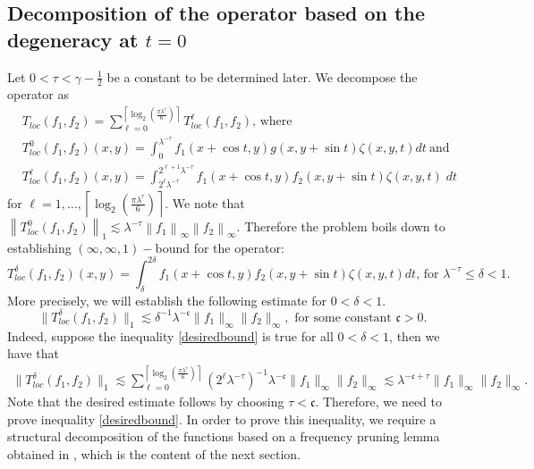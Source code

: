 \documentclass[a4paper,reqno]{amsart}
\theoremstyle{definition}
\theoremstyle{remark}
\numberwithin{equation}{section}
\begin{document}
	\subsection{Decomposition of the operator based on the degeneracy at $t=0$}\label{sec:degeneracy} Let $0<\tau<\gamma-\frac{1}{2}$ be a constant to be determined later. We decompose the operator as
	\[
	\begin{aligned}
		& T_{loc}(f_1,f_2)=\sum_{\ell=0}^{\left\lceil\log_2\left(\frac{\pi\lambda^\tau}{6}\right)\right\rceil} T_{loc}^\ell(f_1,f_2) \text {, where } \\
		& T_{loc}^0(f_1,f_2)(x, y)=\int_0^{\lambda^{-\tau}} f_1(x+\cos t, y) g(x, y+\sin t) \zeta(x,y,t) d t~ \text {and } \\
		& T_{loc}^\ell(f_1,f_2)(x, y)=\int_{2^{\ell} \lambda^{-\tau}}^{2^{\ell+1} \lambda^{-\tau}} f_1(x+\cos t, y) f_2(x, y+\sin t) \zeta(x,y,t)\; d t
	\end{aligned}
	\]
	for $\ell=1,\dots, \left\lceil\log_2\left(\frac{\pi\lambda^\tau}{6}\right)\right\rceil.$	We note that $\left\|T_{loc}^0\left(f_1, f_2\right)\right\|_1 \lesssim \lambda^{-\tau}\left\|f_1\right\|_\infty\left\|f_2\right\|_{\infty}$. Therefore the problem boils down to establishing $(\infty,\infty,1)-$bound for the operator:
	\[
	T_{loc}^\delta\left(f_1, f_2\right)(x, y)=\int_\delta^{2 \delta} f_1(x+\cos t, y) f_2(x, y+\sin t) \zeta(x,y,t) d t \text {, for } \lambda^{-\tau}\leq\delta<1.
	\]
	More precisely, we will establish the following estimate for $0<\delta<1$.
	\begin{equation}\label{desiredbound}
		\|T_{loc}^\delta(f_1,f_2)\|_1\lesssim\delta^{-1}\lambda^{-\mathfrak{c}}\|f_1\|_\infty\|f_2\|_\infty, \text{ for some constant }\mathfrak{c}>0.
	\end{equation}
	Indeed, suppose the inequality \eqref{desiredbound} is true for all $0<\delta<1$, then we have that
	\begin{align*}
		\|T_{loc}^\delta(f_1,f_2)\|_1\lesssim\sum\limits_{\ell=0}^{\left\lceil\log_2\left(\frac{\pi\lambda^\tau}{6}\right)\right\rceil}(2^\ell\lambda^{-\tau})^{-1}\lambda^{-\mathfrak{c}}\|f_1\|_\infty\|f_2\|_\infty\lesssim\lambda^{-\mathfrak{c}+\tau}\|f_1\|_\infty\|f_2\|_\infty.
	\end{align*} 
	Note that the desired estimate follows by choosing $\tau<\mathfrak{c}$. Therefore, we need to prove inequality \eqref{desiredbound}. In order to prove this inequality, we require a structural decomposition of the functions based on a frequency pruning lemma obtained in \cite{CDR}, which is the content of the next section.
\end{document}
